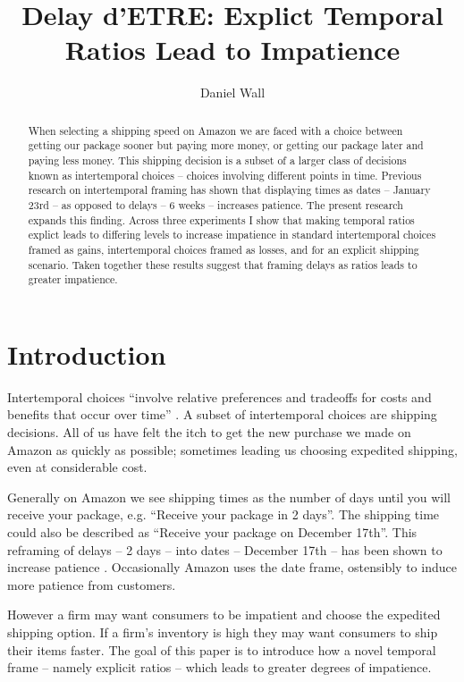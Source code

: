 \documentclass[]{article}
\title{Delay d'ETRE: Explict Temporal Ratios Lead to Impatience}
\author{Daniel Wall}
\begin{document}
\maketitle

\begin{abstract}
	When selecting a shipping speed on Amazon we are faced with a choice between getting our package sooner but paying more money, or getting our package later and paying less money. 
	This shipping decision is a subset of a larger class of decisions known as intertemporal choices -- choices involving different points in time. 
	Previous research on intertemporal framing has shown that displaying times as dates -- January 23rd -- as opposed to delays -- 6 weeks -- increases patience. 
	The present research expands this finding. 
	Across three experiments I show that making temporal ratios explict leads to differing levels to increase impatience in standard  intertemporal choices framed as gains, intertemporal choices framed as losses, and for an explicit shipping scenario. 
	Taken together these results suggest that framing delays as ratios leads to greater impatience.

\end{abstract}

\section{Introduction}

Intertemporal choices ``involve relative preferences and tradeoffs for costs and benefits that occur over time'' \cite[p. 2]{Zauberman2014}.
A subset of intertemporal choices are shipping decisions.
All of us have felt the itch to get the new purchase we made on Amazon as quickly as possible; sometimes leading us choosing expedited shipping, even at considerable cost.

Generally on Amazon we see shipping times as the number of days until you will receive your package, e.g.  ``Receive your package in 2 days''. 
The shipping time could also be described as ``Receive your package on December 17th''. 
This reframing of delays -- 2 days -- into dates -- December 17th -- has been shown to increase patience \cite{Read2005}.
Occasionally Amazon uses the date frame, ostensibly to induce more patience from customers. 

However a firm may want consumers to be impatient and choose the expedited shipping option. 
If a firm's inventory is high they may want consumers to ship their items faster. 
The goal of this paper is to introduce how a novel temporal frame -- namely explicit ratios -- which leads to greater degrees of impatience.
\end{document}
